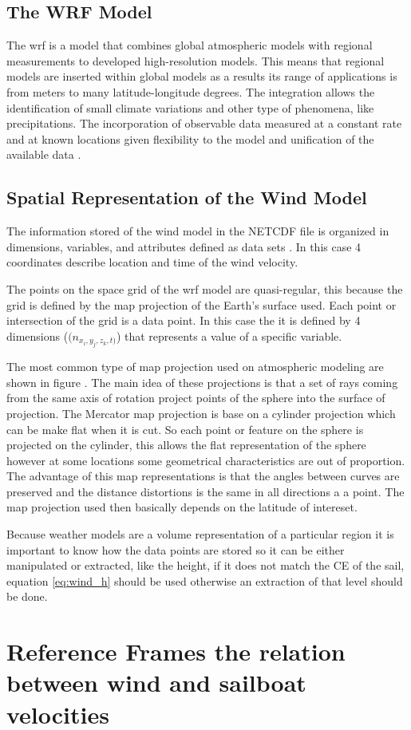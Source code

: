 \subsection{The WRF Model }
The \acrshort{wrf} is a model that combines global atmospheric models with regional measurements to developed high-resolution models. This means that regional models are inserted within global models as a results its range of applications is from meters to many latitude-longitude degrees. The integration allows the identification of small climate variations and other type of phenomena, like precipitations. The incorporation of observable data measured at a constant rate and at known locations given flexibility to the model and unification of the available data \cite{warner2010numerical}. \par

\subsection{Spatial Representation of the Wind Model}
The information stored of the wind model in the NETCDF file is organized in dimensions, variables, and attributes defined as data sets \cite{netcdf56302}. In this case 4 coordinates describe location and time of %
the wind velocity.  \par 




The points on the space grid of the \acrshort{wrf} model are quasi-regular, this because the grid is defined by the map projection of the Earth's surface used. Each point or intersection of the grid is a data point. In this case the it is defined by 4 dimensions ($(n_{x_{i},y_{j},z_{k},t)}$) that represents a value of a specific variable.%

The most common type of map projection used on atmospheric modeling are shown in figure .
The main idea of these projections is that a set of rays coming from the same axis of rotation project points of the sphere into the  surface of projection. The Mercator map projection is base on a cylinder projection which can be make flat when it is cut. So each point or feature on the sphere is projected on the cylinder, this allows the flat representation of the sphere however at some locations some geometrical characteristics are out of proportion. The advantage of this map representations is that the angles between curves are preserved and the distance distortions is the same in all directions a a point. The map projection used then basically depends on the latitude of intereset. 


Because weather models are a volume representation of a particular region it is important to know how the data points are stored so it can be either manipulated or extracted, like the height, if it does not match the CE of the sail, equation \ref{eq:wind_h} should be used otherwise an extraction of that level should be done. \par

\section{Reference Frames the relation between wind and sailboat velocities}

